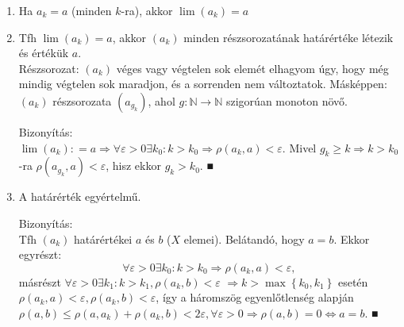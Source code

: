 \documentclass[12pt,a4paper]{scrartcl}
\providecommand{\tightlist}{%
  \setlength{\itemsep}{0pt}\setlength{\parskip}{0pt}}
\newenvironment{bizonyitas}{}{}
\begin{document}
\begin{enumerate}
\def\labelenumi{\arabic{enumi}.}
\tightlist
\item
  Ha \(a_{k} = a\) (minden \(k\)-ra), akkor
  \(\lim\left( a_{k} \right) = a\)
\item
  Tfh \(\lim\left( a_{k} \right) = a\), akkor \(\left( a_{k} \right)\)
  minden részsorozatának határértéke létezik és értékük \(a\).\\
  Részsorozat: \(\left( a_{k} \right)\) véges vagy végtelen sok elemét
  elhagyom úgy, hogy még mindig végtelen sok maradjon, és a sorrenden
  nem változtatok. Másképpen: \(\left( a_{k} \right)\) részsorozata
  \(\left( a_{g_{k}} \right)\), ahol
  \(\left. g:{\mathbb{N}}\rightarrow{\mathbb{N}} \right.\) szigorúan
  monoton növő.

  \begin{bizonyitas}

  Bizonyítás:\\
  \(\left. \lim\left( a_{k} \right): = a\Rightarrow\forall\varepsilon > 0\exists k_{0}:k > k_{0}\Rightarrow\rho\left( {a_{k},a} \right) < \varepsilon \right.\).
  Mivel \(\left. g_{k} \geq k\Rightarrow k > k_{0} \right.\)-ra
  \(\rho\left( {a_{g_{k}},a} \right) < \varepsilon\), hisz ekkor
  \(g_{k} > k_{0}\). ■

  \end{bizonyitas}
\item
  A határérték egyértelmű.

  \begin{bizonyitas}

  Bizonyítás:\\
  Tfh \(\left( a_{k} \right)\) határértékei \(a\) és \(b\) (\(X\)
  elemei). Belátandó, hogy \(a = b\). Ekkor egyrészt:
  \[\left. \forall\varepsilon > 0\exists k_{0}:k > k_{0}\Rightarrow\rho\left( {a_{k},a} \right) < \varepsilon \right.,\]
  másrészt
  \(\forall\varepsilon > 0\exists k_{1}:k > k_{1},\rho\left( {a_{k},b} \right) < \varepsilon\)
  \(\left. \Rightarrow k > \max\left\{ {k_{0},k_{1}} \right\} \right.\)
  esetén
  \(\rho\left( {a_{k},a} \right) < \varepsilon,\rho\left( {a_{k},b} \right) < \varepsilon\),
  így a háromszög egyenlőtlenség alapján
  \(\left. \rho\left( {a,b} \right) \leq \rho\left( {a,a_{k}} \right) + \rho\left( {a_{k},b} \right) < 2\varepsilon,\forall\varepsilon > 0\Rightarrow\rho\left( {a,b} \right) = 0\Leftrightarrow a = b \right.\).
  ■


\end{bizonyitas}
\end{enumerate}
\end{document}
